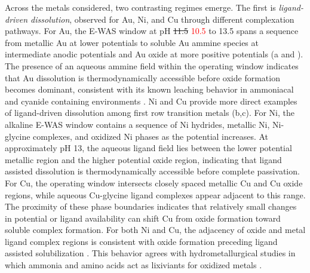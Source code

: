 \documentclass[twoside,twocolumn,9pt]{article}
\begin{document}

Across the metals considered, two contrasting regimes emerge. The first is \emph{ligand-driven dissolution}, observed for Au, Ni, and Cu through different complexation pathways. For Au, the E-WAS window at pH \sout{11.5} \textcolor{red}{10.5} to 13.5 spans a sequence from metallic Au at lower potentials to soluble Au ammine species at intermediate anodic potentials and Au oxide at more positive potentials (a and ). The presence of an aqueous ammine field within the operating window indicates that Au dissolution is thermodynamically accessible before oxide formation becomes dominant, consistent with its known leaching behavior in ammoniacal and cyanide containing environments \cite{Gong2009SurfaceGold,Sarvar2023ApplicationStructure,Hilson2006AlternativesFuture,SPARROW1995CyanideApplications}. Ni and Cu provide more direct examples of ligand-driven dissolution among first row transition metals (b,c). For Ni, the alkaline E-WAS window contains a sequence of Ni hydrides, metallic Ni, Ni-glycine complexes, and oxidized Ni phases as the potential increases. At approximately pH 13, the aqueous ligand field lies between the lower potential metallic region and the higher potential oxide region, indicating that ligand assisted dissolution is thermodynamically accessible before complete passivation. For Cu, the operating window intersects closely spaced metallic Cu and Cu oxide regions, while aqueous Cu-glycine ligand complexes appear adjacent to this range. The proximity of these phase boundaries indicates that relatively small changes in potential or ligand availability can shift Cu from oxide formation toward soluble complex formation. For both Ni and Cu, the adjacency of oxide and metal ligand complex regions is consistent with oxide formation preceding ligand assisted solubilization \cite{Liao2012EffectsCopper,Broeksma2023EvaluatingBoards}. This behavior agrees with hydrometallurgical studies in which ammonia and amino acids act as lixiviants for oxidized metals \cite{Yao2021SelectivePhosphide,Ma2021ALeaching}.
\end{document}
